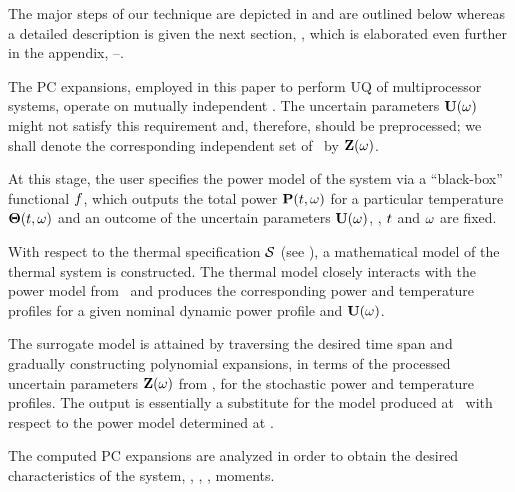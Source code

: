 The major steps of our technique are depicted in  and are outlined below whereas a detailed description is given the next section, , which is elaborated even further in the appendix, --.

 The PC expansions, employed in this paper to perform UQ of multiprocessor systems, operate on mutually independent \rvs. The uncertain parameters $\mathbf{U}(\omega)$ might not satisfy this requirement and, therefore, should be preprocessed; we shall denote the corresponding independent set of \rvs\ by $\mathbf{Z}(\omega)$.

 At this stage, the user specifies the power model of the system via a ``black-box'' functional $f$, which outputs the total power $\mathbf{P}(t, \omega)$ for a particular temperature ${\boldsymbol\Theta}(t, \omega)$ and an outcome of the uncertain parameters $\mathbf{U}(\omega)$, \ie, $t$ and $\omega$ are fixed.

 With respect to the thermal specification $\mathcal{S}$ (see ), a mathematical model of the thermal system is constructed. The thermal model closely interacts with the power model from \ and produces the corresponding power and temperature profiles for a given nominal dynamic power profile and $\mathbf{U}(\omega)$.

 The surrogate model is attained by traversing the desired time span and gradually constructing polynomial expansions, in terms of the processed uncertain parameters $\mathbf{Z}(\omega)$ from , for the stochastic power and temperature profiles. The output is essentially a substitute for the model produced at \ with respect to the power model determined at .

 The computed PC expansions are analyzed in order to obtain the desired characteristics of the system, \eg, \cdfs, \pdfs, moments.
